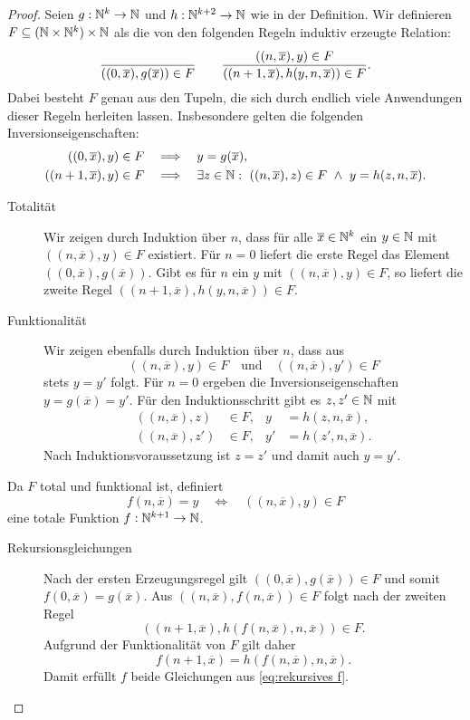 \begin{proof}
	Seien $g:\mathbb{N}^k\to\mathbb{N}$ und $h:\mathbb{N}^{k+2}\to\mathbb{N}$ wie in der Definition.
	Wir definieren $F\subseteq(\mathbb{N}\times\mathbb{N}^k)\times\mathbb{N}$ als die von den
	folgenden Regeln induktiv erzeugte Relation:
	\[
		\frac{\strut}{((0,\overline{x}),g(\overline{x}))\in F}
		\qquad
		\frac{((n,\overline{x}),y)\in F}
		     {((n+1,\overline{x}),h(y,n,\overline{x}))\in F}.
	\]
	Dabei besteht $F$ genau aus den Tupeln, die sich durch endlich viele
	Anwendungen dieser Regeln herleiten lassen. Insbesondere gelten die
	folgenden Inversionseigenschaften:
	\begin{align*}
		((0,\overline{x}),y)\in F
		&\quad\Longrightarrow\quad y=g(\overline{x}),\\
		((n+1,\overline{x}),y)\in F
		&\quad\Longrightarrow\quad
		\exists z\in\mathbb{N}:\
		((n,\overline{x}),z)\in F
		\ \land\ y=h(z,n,\overline{x}).
	\end{align*}

	\begin{description}
	\item[Totalität]
		Wir zeigen durch Induktion über $n$, dass für alle
		$\overline{x}\in\mathbb{N}^k$ ein $y\in\mathbb{N}$ mit
		$((n,\overline{x}),y)\in F$ existiert.
		Für $n=0$ liefert die erste Regel das Element
		$((0,\overline{x}),g(\overline{x}))$.
		Gibt es für $n$ ein $y$ mit $((n,\overline{x}),y)\in F$, so liefert
		die zweite Regel
		$((n+1,\overline{x}),h(y,n,\overline{x}))\in F$.

	\item[Funktionalität]
		Wir zeigen ebenfalls durch Induktion über $n$, dass aus
		\[
			((n,\overline{x}),y)\in F
			\quad\text{und}\quad
			((n,\overline{x}),y')\in F
		\]
		stets $y=y'$ folgt.
		Für $n=0$ ergeben die Inversionseigenschaften
		$y=g(\overline{x})=y'$.
		Für den Induktionsschritt gibt es $z,z'\in\mathbb{N}$ mit
		\begin{align*}
			((n,\overline{x}),z)&\in F,
			&y&=h(z,n,\overline{x}),\\
			((n,\overline{x}),z')&\in F,
			&y'&=h(z',n,\overline{x}).
		\end{align*}
		Nach Induktionsvoraussetzung ist $z=z'$ und damit auch $y=y'$.
	\end{description}

	Da $F$ total und funktional ist, definiert
	\[
		f(n,\overline{x})=y
		\quad\Longleftrightarrow\quad
		((n,\overline{x}),y)\in F
	\]
	eine totale Funktion $f:\mathbb{N}^{k+1}\to\mathbb{N}$.

	\begin{description}
	\item[Rekursionsgleichungen]
		Nach der ersten Erzeugungsregel gilt
		$((0,\overline{x}),g(\overline{x}))\in F$ und somit
		$f(0,\overline{x})=g(\overline{x})$.
		Aus $((n,\overline{x}),f(n,\overline{x}))\in F$ folgt nach der zweiten
		Regel
		\[
			((n+1,\overline{x}),
			h(f(n,\overline{x}),n,\overline{x}))\in F.
		\]
		Aufgrund der Funktionalität von $F$ gilt daher
		\[
			f(n+1,\overline{x})
			=h(f(n,\overline{x}),n,\overline{x}).
		\]
		Damit erfüllt $f$ beide Gleichungen aus \eqref{eq:rekursives f}.


\end{description}
\end{proof}
